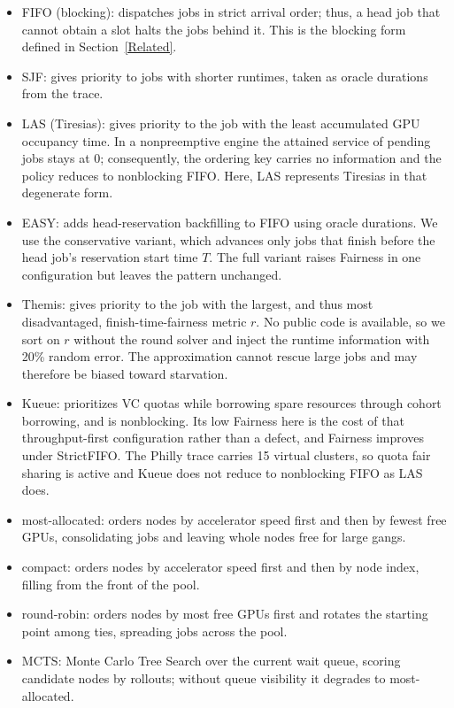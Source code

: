 \documentclass{ieeetj}
\begin{document}
\begin{itemize}
\item FIFO (blocking): dispatches jobs in strict arrival order; thus, a head job that cannot obtain a slot halts the jobs behind it. This is the blocking form defined in Section~\ref{Related}.
\item SJF: gives priority to jobs with shorter runtimes, taken as oracle durations from the trace.
\item LAS (Tiresias): gives priority to the job with the least accumulated GPU occupancy time. In a nonpreemptive engine the attained service of pending jobs stays at 0; consequently, the ordering key carries no information and the policy reduces to nonblocking FIFO. Here, LAS represents Tiresias in that degenerate form.
\item EASY: adds head-reservation backfilling to FIFO using oracle durations. We use the conservative variant, which advances only jobs that finish before the head job's reservation start time $T$. The full variant raises Fairness in one configuration but leaves the pattern unchanged.
\item Themis: gives priority to the job with the largest, and thus most disadvantaged, finish-time-fairness metric $r$. No public code is available, so we sort on $r$ without the round solver and inject the runtime information with 20\% random error. The approximation cannot rescue large jobs and may therefore be biased toward starvation.
\item Kueue: prioritizes VC quotas while borrowing spare resources through cohort borrowing, and is nonblocking. Its low Fairness here is the cost of that throughput-first configuration rather than a defect, and Fairness improves under StrictFIFO. The Philly trace carries 15 virtual clusters, so quota fair sharing is active and Kueue does not reduce to nonblocking FIFO as LAS does.
\item most-allocated: orders nodes by accelerator speed first and then by fewest free GPUs, consolidating jobs and leaving whole nodes free for large gangs.
\item compact: orders nodes by accelerator speed first and then by node index, filling from the front of the pool.
\item round-robin: orders nodes by most free GPUs first and rotates the starting point among ties, spreading jobs across the pool.
\item MCTS: Monte Carlo Tree Search over the current wait queue, scoring candidate nodes by rollouts; without queue visibility it degrades to most-allocated.

\end{itemize}
\end{document}
